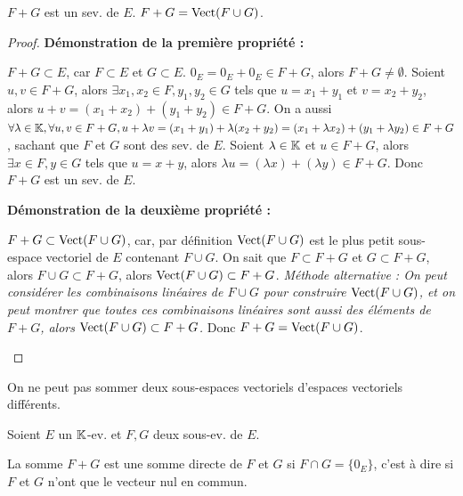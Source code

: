 \documentclass[12pt, a4paper]{report}
\begin{document}
\begin{property}
    \begin{outline}
    \1 $F+G$ est un sev. de $E$.
    \1 $F+G = \mathrm{Vect}(F \cup G)$.
    \end{outline}
\end{property}

\begin{proof}
    \textbf{Démonstration de la première propriété :}

    \begin{outline}
        \1 $F+G \subset E$, car $F \subset E$ et $G \subset E$.
        \1 $0_E = 0_E + 0_E \in F+G$, alors $F+G \ne \emptyset$.
        \1 Soient $u,v \in F+G$, alors $\exists x_1,x_2 \in F, y_1,y_2 \in G$ tels que $u = x_1 + y_1$ et $v = x_2 + y_2$, alors $u+v = (x_1+x_2) + (y_1+y_2) \in F+G$.
        \1 On a aussi $\forall \lambda \in \mathbb{K}, \forall u,v \in F+G, u + \lambda v = (x_1 + y_1) + \lambda (x_2 + y_2) = (x_1 + \lambda x_2) + (y_1 + \lambda y_2) \in F+G$, sachant que $F$ et $G$ sont des sev. de $E$.
        \1 Soient $\lambda \in \mathbb{K}$ et $u \in F+G$, alors $\exists x \in F, y \in G$ tels que $u = x+y$, alors $\lambda u = (\lambda x) + (\lambda y) \in F+G$.
        \1 Donc $F+G$ est un sev. de $E$.
    \end{outline}

    \textbf{Démonstration de la deuxième propriété :}

    \begin{outline}
        \1 $F+G \subset \mathrm{Vect}(F \cup G)$, car, par définition $\mathrm{Vect}(F \cup G)$ est le plus petit sous-espace vectoriel de $E$ contenant $F \cup G$.
        \1 On sait que $F \subset F+G$ et $G \subset F+G$, alors $F \cup G \subset F+G$, alors $\mathrm{Vect}(F \cup G) \subset F+G$.
        \1 \textit{Méthode alternative : On peut considérer les combinaisons linéaires de $F \cup G$ pour construire $\mathrm{Vect}(F \cup G)$, et on peut montrer que toutes ces combinaisons linéaires sont aussi des éléments de $F+G$, alors $\mathrm{Vect}(F \cup G) \subset F+G$.}
        \1 Donc $F+G = \mathrm{Vect}(F \cup G)$.
    \end{outline}
\end{proof}

\begin{attention}
    On ne peut pas sommer deux sous-espaces vectoriels d'espaces vectoriels différents.
\end{attention}

\begin{definition}
    Soient $E$ un $\mathbb{K}$-ev. et $F,G$ deux sous-ev. de $E$.

    La somme $F+G$ est une somme directe de $F$ et $G$ si $F \cap G = \{0_E\}$, c'est à dire si $F$ et $G$ n'ont que le vecteur nul en commun.
\end{definition}
\end{document}
